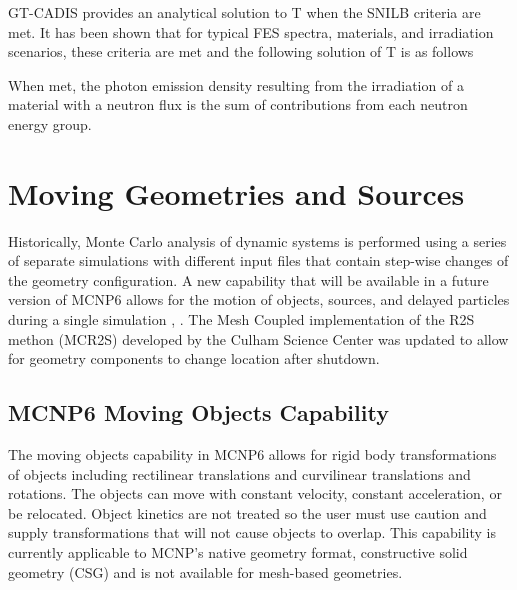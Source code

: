 GT-CADIS provides an analytical solution to T when the SNILB criteria are met.
It has been shown that for typical FES spectra, materials, and irradiation
scenarios, these criteria are met and the following solution of T is as follows

When met, the photon emission density resulting from the irradiation of a
material with a neutron flux is the sum of contributions from each neutron
energy group.

\section{Moving Geometries and Sources} \label{sec:moving_sys}
Historically, Monte Carlo analysis of dynamic systems is performed using a series of separate
simulations with different input files that contain step-wise changes of the
geometry configuration. 
A new capability that will be available in a future version of MCNP6 allows for the
motion of objects, sources, and delayed particles during a single simulation
\cite{mcnp_moving_1}, \cite{mcnp_moving_2}.
The Mesh Coupled implementation of the R2S methon (MCR2S) \cite{mcr2s}
developed by the Culham Science Center was updated to allow for geometry
components to change location after shutdown.

\subsection{MCNP6 Moving Objects Capability} \label{sec:mcnp_move}
The moving objects capability in MCNP6 allows for rigid body transformations of 
objects including rectilinear translations and curvilinear translations and rotations.
The objects can move with constant velocity, constant acceleration, or be
relocated.
Object kinetics are not treated so the user must use caution and supply
transformations that will not cause objects to overlap.
This capability is currently applicable to MCNP's native geometry format,
constructive solid geometry (CSG) and is not available for mesh-based
geometries.

